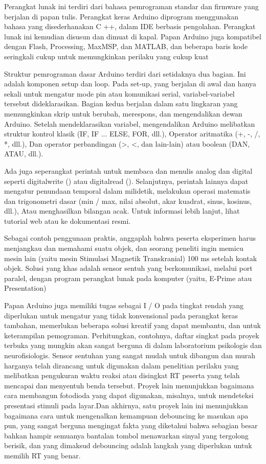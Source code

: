  	Perangkat lunak ini terdiri dari bahasa pemrograman standar dan firmware yang berjalan di papan tulis. Perangkat keras Arduino diprogram menggunakan bahasa yang disederhanakan C ++, dalam IDE berbasis pengolahan. Perangkat lunak ini kemudian disusun dan dimuat di kapal. Papan Arduino juga kompatibel dengan Flash, Processing, MaxMSP, dan MATLAB, dan beberapa baris kode seringkali cukup untuk memungkinkan perilaku yang cukup kuat
 
 	Struktur pemrograman dasar Arduino terdiri dari setidaknya dua bagian. Ini adalah komponen setup dan loop. Pada set-up, yang berjalan di awal dan hanya sekali untuk mengatur mode pin atau komunikasi serial, variabel-variabel tersebut dideklarasikan. Bagian kedua berjalan dalam satu lingkaran yang memungkinkan skrip untuk berubah, merespons, dan mengendalikan dewan Arduino. Setelah mendeklarasikan variabel, mengendalikan Arduino melibatkan struktur kontrol klasik (IF, IF ... ELSE, FOR, dll.), Operator aritmatika (+, -, /, *, dll.), Dan operator perbandingan (>, <, dan lain-lain) atau boolean (DAN, ATAU, dll.). 
 	
 	Ada juga seperangkat perintah untuk membaca dan menulis analog dan digital seperti digitalwrite () atau digitalread (). Selanjutnya, perintah lainnya dapat mengatur penundaan temporal dalam milidetik, melakukan operasi matematis dan trigonometri dasar (min / max, nilai absolut, akar kuadrat, sinus, kosinus, dll.), Atau menghasilkan bilangan acak. Untuk informasi lebih lanjut, lihat tutorial web atau ke dokumentasi resmi.

 	Sebagai contoh penggunaan praktis, anggaplah bahwa peserta eksperimen harus menjangkau dan memahami suatu objek, dan seorang peneliti ingin memicu mesin lain (yaitu mesin Stimulasi Magnetik Transkranial) 100 ms setelah kontak objek. Solusi yang khas adalah sensor sentuh yang berkomunikasi, melalui port paralel, dengan program perangkat lunak pada komputer (yaitu, E-Prime atau Presentation)

 	Papan Arduino juga memiliki tugas sebagai I / O pada tingkat rendah yang diperlukan untuk mengatur yang tidak konvensional  pada perangkat keras tambahan, memerlukan beberapa solusi kreatif yang dapat membantu, dan untuk keterampilan pemograman. Perhitungkan, contohnya, daftar singkat pada proyek terbuka yang mungkin akan sangat berguna di dalam laboratorium psikologis dan neurofisiologis. Sensor sentuhan yang sangat mudah untuk dibangun dan murah harganya telah dirancang untuk digunakan dalam penelitian perilaku yang melibatkan pengukuran waktu reaksi atau disingkat RT peserta yang telah mencapai dan menyentuh benda tersebut. Proyek lain menunjukkan bagaimana cara membangun fotodioda yang dapat digunakan, misalnya, untuk mendeteksi presentasi stimuli pada layar.Dan akhirnya, satu proyek lain ini menunjukkan bagaimana cara untuk mengenalkan kemampuan debouncing ke masukan apa pun, yang sangat berguna mengingat fakta yang diketahui bahwa sebagian besar bahkan hampir semuanya bantalan tombol menawarkan sinyal yang tergolong berisik, dan yang dimaksud debouncing adalah langkah yang diperlukan untuk memilih RT yang benar.\cite{fatoni2017perancangan}